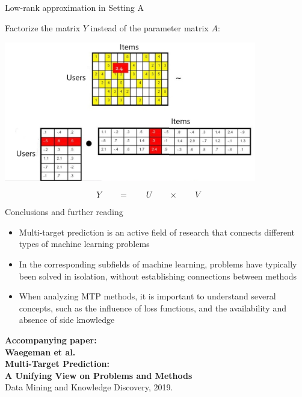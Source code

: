\documentclass[]{beamer}
\begin{document}
\begin{frame}{Low-rank approximation in Setting A}

Factorize the matrix $Y$ instead of the parameter matrix $A$: 
\begin{center}
\includegraphics[width=11cm]{Figures/matrixcompletion2}
\end{center}
$$Y \qquad = \qquad  U \qquad \times \qquad V \qquad $$

\end{frame}





\begin{frame}{Conclusions and further reading}

\begin{itemize}
\item Multi-target prediction is an active field of research that connects different types of machine learning problems
\item In the corresponding subfields of machine learning, problems have typically been solved in isolation, without establishing connections between methods
\item When analyzing MTP methods, it is important to understand several concepts, such as the influence of loss functions, and the availability and absence of side knowledge
\end{itemize}

\begin{center}
{\bf Accompanying paper: \\
Waegeman et al. \\ Multi-Target Prediction: \\ A Unifying View on Problems and Methods} \\
Data Mining and Knowledge Discovery, 2019. 

\end{center}

\end{frame}
\end{document}
